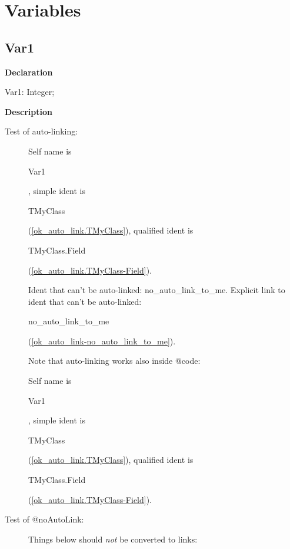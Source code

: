 \documentclass{report}
\begin{document}
\section{Variables}
\subsection*{Var1}
\begin{list}{}{
\setlength{\itemindent}{0cm}
\setlength{\listparindent}{0cm}
\setlength{\leftmargin}{\evensidemargin}
\addtolength{\leftmargin}{\tmplength}
\settowidth{\labelsep}{X}
\addtolength{\leftmargin}{\labelsep}
\setlength{\labelwidth}{\tmplength}
}
\begin{flushleft}
\item[\textbf{Declaration}\hfill]
\begin{ttfamily}
Var1: Integer;\end{ttfamily}


\end{flushleft}
\par
\item[\textbf{Description}]
\begin{description}
\item[Test of auto{-}linking:]  Self name is \begin{ttfamily}Var1\end{ttfamily}, simple ident is \begin{ttfamily}TMyClass\end{ttfamily}(\ref{ok_auto_link.TMyClass}), qualified ident is \begin{ttfamily}TMyClass.Field\end{ttfamily}(\ref{ok_auto_link.TMyClass-Field}).

Ident that can't be auto{-}linked: no{\_}auto{\_}link{\_}to{\_}me. Explicit link to ident that can't be auto{-}linked: \begin{ttfamily}no{\_}auto{\_}link{\_}to{\_}me\end{ttfamily}(\ref{ok_auto_link-no_auto_link_to_me}).

Note that auto{-}linking works also inside @code:

\begin{ttfamily} Self name is \begin{ttfamily}Var1\end{ttfamily}, simple ident is \begin{ttfamily}TMyClass\end{ttfamily}(\ref{ok_auto_link.TMyClass}), qualified ident is \begin{ttfamily}TMyClass.Field\end{ttfamily}(\ref{ok_auto_link.TMyClass-Field}). \end{ttfamily} 
\item[Test of @noAutoLink:]  Things below should \textit{not} be converted to links:


\end{description}
\end{list}
\end{document}
